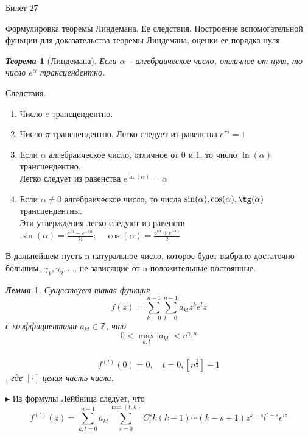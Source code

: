 \documentclass[a4paper,12pt]{article}
\newtheorem{teo}{\textit{Теорема}}
\newtheorem{lem}{\textit{Лемма}}
\newcommand{\AL}{\alpha}
\newcommand{\q}{\quad}
\newcommand{\pb}{\blacktriangleright}
\newcommand{\bb}[1]{\mathbb{#1}}
\newcommand{\SL}{\sum\limits}
\begin{document}
\newpage
\begin{mybox}{\hypertarget{bil27}{Билет 27}}

\begin{formbox}{}
Формулировка теоремы Линдемана. Ее следствия. Построение вспомогательной функции для доказательства теоремы Линдемана, оценки ее порядка нуля.
\end{formbox}

\begin{formbox}{}
\begin{teo} [Линдемана] Если $\AL$ -- алгебраическое число, отличное от нуля, то число $e^\AL$ трансцендентно.
\end{teo}
\end{formbox}
Следствия. 
\begin{enumerate}
\item Число $e$ трансцендентно.
\item Число $\pi$ трансцендентно.
Легко следует из равенства $e^{\pi i} = 1$
\item Если $\AL$ алгебраическое число, отличное от 0 и 1, то число $\ln(\AL)$ трансцендентно. \\Легко следует из равенства $e^{\ln(\AL)} = \AL$
\item Если $\AL\not=0$ алгебраическое число, то числа $\sin(\AL), \cos(\AL) , \tg(\AL) $ трансцендентны.\\
Эти утверждения легко следуют из равенств\\ $\sin(\AL) = \frac{e^{i\AL} - e^{-i\AL}}{2i};\q \cos(\AL) = \frac{e^{i\AL} + e^{-i\AL}}{2} $
\end{enumerate}
В дальнейшем пусть n натуральное число, которое будет выбрано достаточно большим, $\gamma_1,\gamma_2,\dots$, не зависящие от n положительные постоянные.

\begin{formbox}{}
\begin{lem} 
Существует такая функция 
\begin{equation}f(z) = \SL_{k=0}^{n-1}\SL_{l=0}^{n-1}a_{kl}z^ke^lz \end{equation} с коэффициентами $a_{kl} \in \bb{Z}$, что \begin{equation}0 < \max\limits_{k,l} |a_{kl}| < n^{\gamma_1n}\end{equation}\\
\begin{equation}
f^{(t)}(0) = 0, \q t = \overline{0, [n^{\frac{3}{2}}]-1} \label{eq::1} \end{equation}, где $[\cdot]$ целая часть числа.
\end{lem}
\end{formbox}
$\pb$ Из формулы Лейбница следует, что \begin{equation}f^{(t)}(z) = \SL_{k,l=0}^{n-1} a_{kl} \SL_{s=0}^{\min(t,k)} C^s_t k(k - 1)\cdots(k - s + 1)z^{k-s}l^{t-s} e^{lz}\label{eq::5}\end{equation}
\end{mybox}
\end{document}

